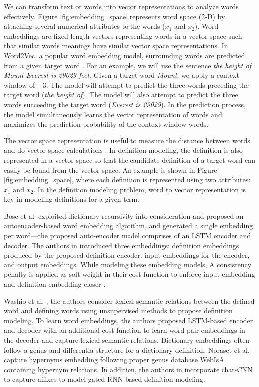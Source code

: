 We can transform text or words into vector representations to analyze words effectively.  Figure \ref{fig:embedding_space} represents word space (2-D) by attaching several numerical
attributes to the words ($x_1$ and $x_2$). Word embeddings are fixed-length vectors representing words in a vector space such that similar words meanings have similar vector space representations. In  Word2Vec, a popular word embedding model, surrounding words are predicted from a given target word \cite{mikolov_efficient_2013}. For an example, we will use the sentence \textit{the height of Mount Everest is 29029 feet}. Given a target word \textit{Mount}, we apply a context window of $\pm3$. The model will attempt to predict the three words preceding the target word (\textit{the height of}). The model will also attempt to predict the three words succeeding the target word (\textit{Everest is 29029}). In the prediction process, the model simultaneously learns the vector representation of words and maximizes the prediction
probability of the context window words.

The vector space representation is useful to measure the distance between words and do vector space calculations \cite{mikolov_distributed_2013}. In definition
modeling, the definition is also represented in a
vector space so that the candidate definition of a target word can easily be found from the vector space. An example is
shown in Figure \ref{fig:embedding_space}, where each definition is represented using two attributes: $x_1$ and $x_2$. In the definition modeling problem, word
to vector representation is key in modeling definitions for a given
term.

Bosc et al. \cite{bosc_auto_2018} exploited dictionary recursivity into
consideration and proposed an autoencoder-based word embedding algorithm, and
generated a single embedding per word—the proposed auto-encoder model comprises
of an LSTM encoder and decoder. The authors in \cite{bosc_auto_2018} introduced three embeddings:
definition embeddings produced by the proposed definition encoder, input
embeddings for the encoder, and output embeddings. While
modeling these embedding models, A consistency penalty is applied as
soft weight in their cost function to enforce input embedding and definition
embedding closer \cite{bosc_auto_2018}.

Washio et al. \cite{washio_bridging_2019}, the authors consider lexical-semantic
relations between the defined word and defining words using unsupervised methods
to propose definition modeling. To learn word embeddings, the authors proposed
LSTM-based encoder and decoder with an additional cost function to learn
word-pair embeddings in the decoder and capture lexical-semantic relations.
Dictionary embeddings often follow a genus and differentia structure for a
dictionary definition. Noraset et al.~\cite{noraset_definition_2016} capture
hypernyms embedding following proper genus database WebIsA containing hypernym
relations. In addition, the authors in \cite{noraset_definition_2016} incorporate char-CNN to capture affixes to
model gated-RNN based definition modeling.

